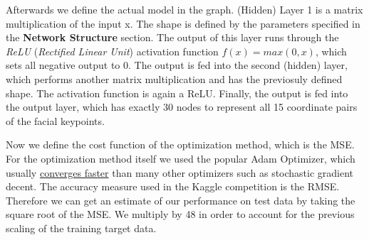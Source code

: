\documentclass[]{article}
\newenvironment{Shaded}{\begin{snugshade}}{\end{snugshade}}
\newcommand{\KeywordTok}[1]{\textcolor[rgb]{0.13,0.29,0.53}{\textbf{{#1}}}}
\newcommand{\StringTok}[1]{\textcolor[rgb]{0.31,0.60,0.02}{{#1}}}
\newcommand{\NormalTok}[1]{{#1}}
\begin{document}
Afterwards we define the actual model in the graph. (Hidden) Layer 1 is
a matrix multiplication of the input x. The shape is defined by the
parameters specified in the \textbf{Network Structure} section. The
output of this layer runs through the \emph{ReLU} (\emph{Rectified
Linear Unit}) activation function \(f(x)=max(0, x)\), which sets all
negative output to 0. The output is fed into the second (hidden) layer,
which performs another matrix multiplication and has the previosuly
defined shape. The activation function is again a ReLU. Finally, the
output is fed into the output layer, which has exactly 30 nodes to
represent all 15 coordinate pairs of the facial keypoints.

\begin{Shaded}
\end{Shaded}

Now we define the cost function of the optimization method, which is the
MSE. For the optimization method itself we used the popular Adam
Optimizer, which usually
\href{https://arxiv.org/pdf/1412.6980v8.pdf}{converges faster} than many
other optimizers such as stochastic gradient decent. The accuracy
measure used in the Kaggle competition is the RMSE. Therefore we can get
an estimate of our performance on test data by taking the square root of
the MSE. We multiply by 48 in order to account for the previous scaling
of the training target data.
\end{document}
